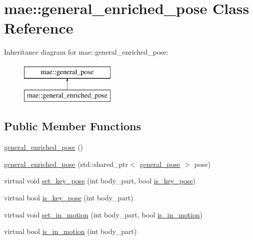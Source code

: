 \hypertarget{classmae_1_1general__enriched__pose}{\section{mae\-:\-:general\-\_\-enriched\-\_\-pose Class Reference}
\label{classmae_1_1general__enriched__pose}
}
Inheritance diagram for mae\-:\-:general\-\_\-enriched\-\_\-pose\-:\begin{figure}[H]
\begin{center}
\leavevmode
\includegraphics[height=2.000000cm]{classmae_1_1general__enriched__pose}
\end{center}
\end{figure}
\subsection*{Public Member Functions}
\begin{DoxyCompactItemize}
\item 
\hyperlink{classmae_1_1general__enriched__pose_a3b4b9e81621a54059679e2746a760d74}{general\-\_\-enriched\-\_\-pose} ()
\item 
\hyperlink{classmae_1_1general__enriched__pose_ab0656b1482a47c43f1d04be2b457b8ca}{general\-\_\-enriched\-\_\-pose} (std\-::shared\-\_\-ptr$<$ \hyperlink{classmae_1_1general__pose}{general\-\_\-pose} $>$ pose)
\item 
virtual void \hyperlink{classmae_1_1general__enriched__pose_ac6dabf701b6a352b669bf11335827da2}{set\-\_\-key\-\_\-pose} (int body\-\_\-part, bool \hyperlink{classmae_1_1general__enriched__pose_aeb367ce952171488fb93c5bc84d1f0df}{is\-\_\-key\-\_\-pose})
\item 
virtual bool \hyperlink{classmae_1_1general__enriched__pose_aeb367ce952171488fb93c5bc84d1f0df}{is\-\_\-key\-\_\-pose} (int body\-\_\-part)
\item 
virtual void \hyperlink{classmae_1_1general__enriched__pose_a5247ebb0b3f6b2d83a19705c3748ce12}{set\-\_\-in\-\_\-motion} (int body\-\_\-part, bool \hyperlink{classmae_1_1general__enriched__pose_a7a5928c1984b86377dcf038cd550af04}{is\-\_\-in\-\_\-motion})
\item 
virtual bool \hyperlink{classmae_1_1general__enriched__pose_a7a5928c1984b86377dcf038cd550af04}{is\-\_\-in\-\_\-motion} (int body\-\_\-part)
\end{DoxyCompactItemize}



